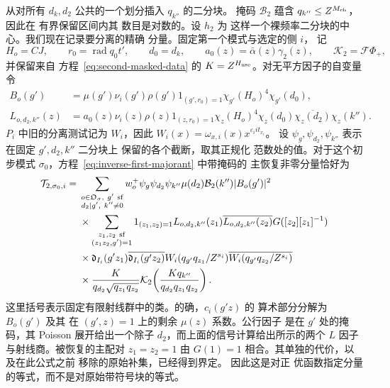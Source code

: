 从对所有 \(d_k,d_2\) 公共的一个划分插入 \(q_{k''}\) 的二分块。
掩码 \(\mathcal B_2\) 蕴含 \(q_{k''}\le Z^{M_{\rm ch}}\)，因此在
有界保留区间内其
数目是对数的。设 \(h_2\) 为
这样一个裸频率二分块的中心。我们现在记录要分离的精确
分量。固定第一个模式与选定的侧 \(i\)，
记
\[
 H_o=CJ,\qquad r_0=\operatorname{rad}q_0t',\qquad d_0=d_k,
 \qquad a_0(z)=\bar\alpha(z)\gamma_2(z),\qquad
 \mathcal K_2=\mathcal F\Phi_+,
\]
并保留来自
方程~\eqref{eq:second-masked-data} 的 \(K=Z^{H_{\rm use}}\)。对无平方因子的自变量令
\begin{equation}\label{eq:inverse-second-outer-coefficients}
 \begin{split}
 B_o(g')&=\mu(g')\nu_i(g')\rho(g')1_{(g',r_0)=1}
              \chi_{g'}(H_o)^4\chi_{g'}(d_0),\\
 L_{o,d_2,k''}(z)&=a_0(z)\nu_i(z)\rho(z)1_{(z,r_0)=1}
       \chi_z(H_o)^4\chi_z(d_0)\overline{\chi_z(d_2)}\chi_z(k'').
 \end{split}
\end{equation}
\(P_i\) 中旧的分离测试记为 \(W_i\)，因此
\(W_i(x)=\omega_{x,i}(x)x^{\varepsilon_iit_{x_i}}\)。
设 \(\psi_g,\psi_{d_2},\psi_{k''}\) 表示在固定 \(g',d_2,k''\) 二分块上
保留的各个截断，取其正规化
范数处的值。对于这个初步模式 \(\sigma_0\)，方程~\eqref{eq:inverse-first-majorant}
中带掩码的
主恢复非零分量恰好为
\begin{equation}\label{eq:inverse-second-formal-component}
 \begin{split}
 \mathcal T_{2,\sigma_0,i}={}&
 \sum_{\substack{o\in\mathfrak O_\sigma,\ g'\ {\rm sf}\\
d_2\mid g',\ k''\ne0}}
 w_o^+\psi_g\psi_{d_2}\psi_{k''}\mu(d_2)\mathcal B_2(k'')|B_o(g')|^2\\
 &\times\sum_{\substack{z_1,z_2\ {\rm sf}\\
(z_1z_2,g')=1}}
 1_{(z_1,z_2)=1}L_{o,d_2,k''}(z_1)\overline{L_{o,d_2,k''}(z_2)}
       G([z_2][z_1]^{-1})\\
 &\times\mathfrak d_{I_i}(g'z_1)\overline{\mathfrak d_{I_i}(g'z_2)}
       W_i(q_{g'}q_{z_1}/Z^{s_i})
       \overline{W_i(q_{g'}q_{z_2}/Z^{s_i})}\\
 &\times\frac{K}{q_{d_2}\sqrt{q_{z_1}q_{z_2}}}
       \mathcal K_2\!\left(\frac{Kq_{k''}}{q_{d_2}q_{z_1}q_{z_2}}\right).
 \end{split}
\end{equation}
这里括号表示固定有限射线群中的类。的确，\(c_i(g'z)\) 的
算术部分分解为 \(B_o(g')\) 及其
在 \((g',z)=1\) 上的剩余 \(\mu(z)\) 系数。公行因子
是在 \(g'\) 处的掩码，其 Poisson 展开给出一个除子
\(d_2\)，而上面的信号计算给出所示的两个
\(L\) 因子与射线商。被恢复的主配对
\(z_1=z_2=1\) 由 \(G(1)=1\) 相合。其单独的代价，以及在此公式之前
移除的原始补集，已经得到界定。
因此这是对正
优函数指定分量的等式，而不是对原始带符号块的等式。

